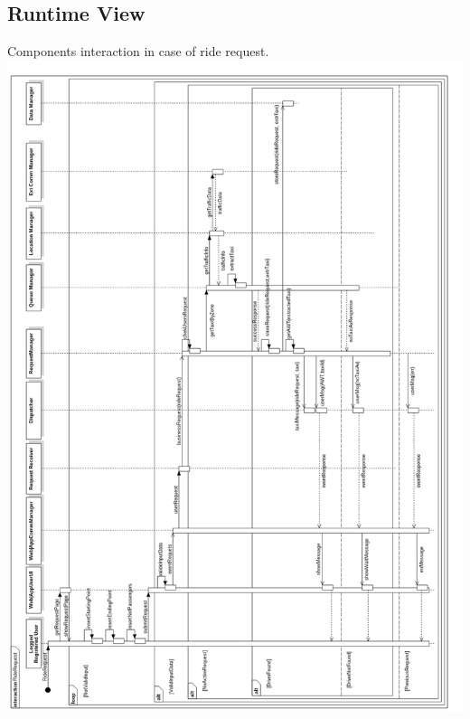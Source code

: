 \documentclass[11pt,titlepage]{article} %
\newenvironment{changemargin}[3]{%
\begin{list}{}{%
\setlength{\topsep}{0pt}%
\setlength{\headsep}{#3}%
\setlength{\leftmargin}{#1}%
\setlength{\rightmargin}{#2}%
\setlength{\listparindent}{\parindent}%
\setlength{\itemindent}{\parindent}%
\setlength{\parsep}{\parskip}%
}%
\item[]}{\end{list}}
\begin{document}
\subsection{Runtime View}
\begin{changemargin}{0cm}{0cm}{-2.5cm}
	Components interaction in case of ride request.\newline
	\noindent
	\includegraphics[scale=0.42]{sd1.png}
\end{changemargin}
\newpage
\end{document}
